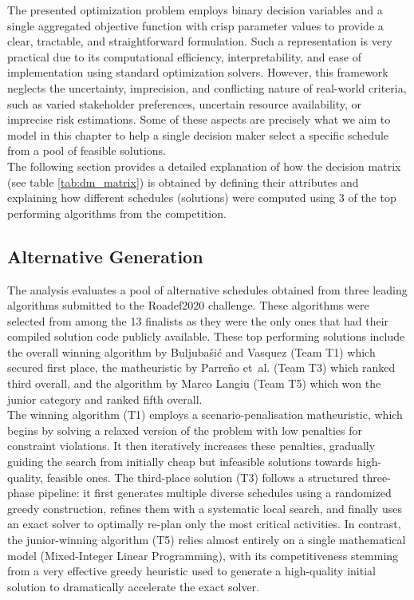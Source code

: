 The presented optimization problem employs binary decision variables and a single aggregated objective function with crisp parameter values to provide a clear, tractable, and straightforward formulation. Such a representation is very practical due to its computational efficiency, interpretability, and ease of implementation using standard optimization solvers. However, this framework neglects the uncertainty, imprecision, and conflicting nature of  real-world criteria, such as varied stakeholder preferences, uncertain resource availability, or imprecise risk estimations. Some of these aspects are precisely what we aim to model in this chapter to help a single decision maker select a specific schedule from a pool of feasible solutions. \\

The following section provides a detailed explanation of how the decision matrix (see table \ref{tab:dm_matrix}) is obtained by defining their attributes and explaining how different schedules (solutions) were computed using 3 of the top performing algorithms from the competition.

\subsection{Alternative Generation}

The analysis evaluates a pool of alternative schedules obtained from three leading algorithms submitted to the Roadef2020 challenge. These algorithms were selected from among the 13 finalists as they were the only ones that had their compiled solution code publicly available. These top performing solutions include the overall winning algorithm by Buljubašić and Vasquez\cite{top1} (Team T1) which secured first place, the matheuristic by Parreño et~al.\cite{ConsueloRoadef} (Team T3) which ranked third overall, and the algorithm by Marco Langiu\cite{top5} (Team T5) which won the junior category and ranked fifth overall.\\



The winning algorithm (T1) employs a scenario-penalisation matheuristic, which begins by solving a relaxed version of the problem with low penalties for constraint violations. It then iteratively increases these penalties, gradually guiding the search from initially cheap but infeasible solutions towards high-quality, feasible ones. The third-place solution (T3) follows a structured three-phase pipeline: it first generates multiple diverse schedules using a randomized greedy construction, refines them with a systematic local search, and finally uses an exact solver to optimally re-plan only the most critical activities. In contrast, the junior-winning algorithm (T5) relies almost entirely on a single mathematical model (Mixed-Integer Linear Programming), with its competitiveness stemming from a very effective greedy heuristic used to generate a high-quality initial solution to dramatically accelerate the exact solver.\\

